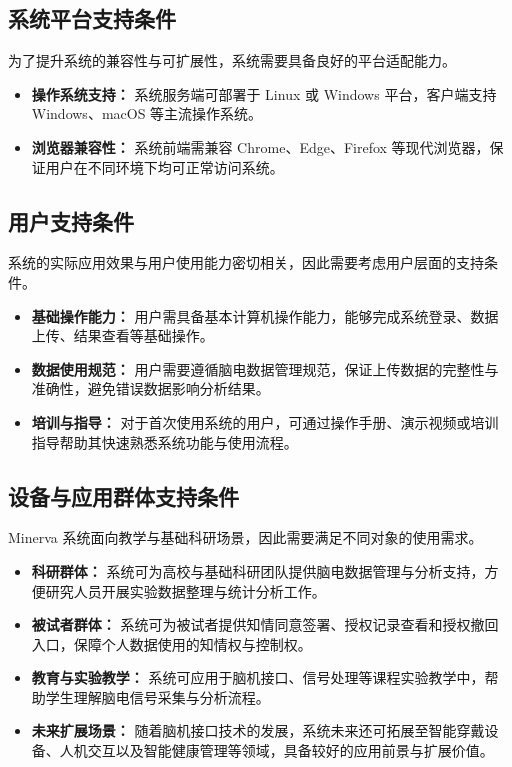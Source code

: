 \subsection{系统平台支持条件}

为了提升系统的兼容性与可扩展性，系统需要具备良好的平台适配能力。

\begin{itemize}
	\item \textbf{操作系统支持：} 系统服务端可部署于 Linux 或 Windows 平台，客户端支持 Windows、macOS 等主流操作系统。
	
	\item \textbf{浏览器兼容性：} 系统前端需兼容 Chrome、Edge、Firefox 等现代浏览器，保证用户在不同环境下均可正常访问系统。

\end{itemize}

\subsection{用户支持条件}

系统的实际应用效果与用户使用能力密切相关，因此需要考虑用户层面的支持条件。

\begin{itemize}
	\item \textbf{基础操作能力：} 用户需具备基本计算机操作能力，能够完成系统登录、数据上传、结果查看等基础操作。
	
	\item \textbf{数据使用规范：} 用户需要遵循脑电数据管理规范，保证上传数据的完整性与准确性，避免错误数据影响分析结果。
	
	\item \textbf{培训与指导：} 对于首次使用系统的用户，可通过操作手册、演示视频或培训指导帮助其快速熟悉系统功能与使用流程。
\end{itemize}

\subsection{设备与应用群体支持条件}

Minerva 系统面向教学与基础科研场景，因此需要满足不同对象的使用需求。

\begin{itemize}
	\item \textbf{科研群体：} 系统可为高校与基础科研团队提供脑电数据管理与分析支持，方便研究人员开展实验数据整理与统计分析工作。
	
	\item \textbf{被试者群体：} 系统可为被试者提供知情同意签署、授权记录查看和授权撤回入口，保障个人数据使用的知情权与控制权。
	
	\item \textbf{教育与实验教学：} 系统可应用于脑机接口、信号处理等课程实验教学中，帮助学生理解脑电信号采集与分析流程。
	
	\item \textbf{未来扩展场景：} 随着脑机接口技术的发展，系统未来还可拓展至智能穿戴设备、人机交互以及智能健康管理等领域，具备较好的应用前景与扩展价值。
\end{itemize}
